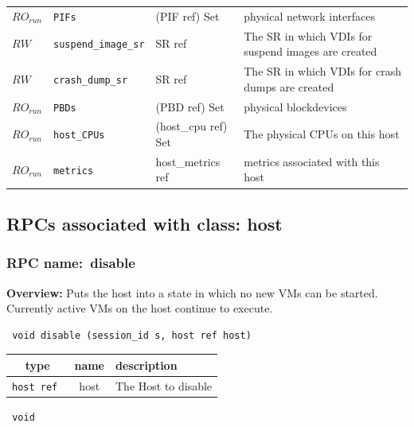 \begin{longtable}{|lllp{}|}
$\mathit{RO}_\mathit{run}$ &  {\tt PIFs} & (PIF ref) Set & physical network interfaces \\
$\mathit{RW}$ &  {\tt suspend\_image\_sr} & SR ref & The SR in which VDIs for suspend images are created \\
$\mathit{RW}$ &  {\tt crash\_dump\_sr} & SR ref & The SR in which VDIs for crash dumps are created \\
$\mathit{RO}_\mathit{run}$ &  {\tt PBDs} & (PBD ref) Set & physical blockdevices \\
$\mathit{RO}_\mathit{run}$ &  {\tt host\_CPUs} & (host\_cpu ref) Set & The physical CPUs on this host \\
$\mathit{RO}_\mathit{run}$ &  {\tt metrics} & host\_metrics ref & metrics associated with this host \\
\hline
\end{longtable}
\subsection{RPCs associated with class: host}
\subsubsection{RPC name:~disable}

{\bf Overview:} 
Puts the host into a state in which no new VMs can be started. Currently
active VMs on the host continue to execute.

\begin{verbatim} void disable (session_id s, host ref host)\end{verbatim}



 
\vspace{0.3cm}
\begin{tabular}{|c|c|p{7cm}|}
 \hline
{\bf type} & {\bf name} & {\bf description} \\ \hline
{\tt host ref } & host & The Host to disable \\ \hline 

\end{tabular}

\vspace{0.3cm}

{\tt 
void
}



\vspace{0.3cm}
\vspace{0.3cm}
\vspace{0.3cm}
